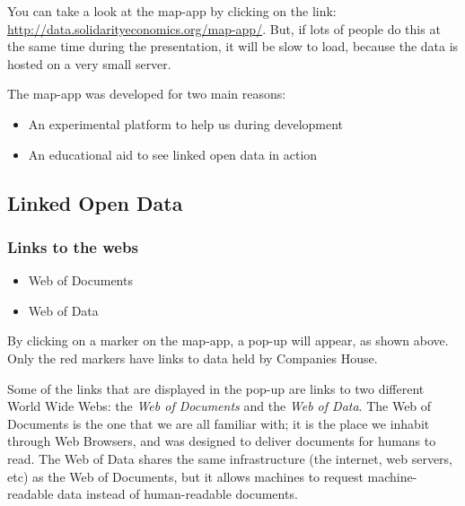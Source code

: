 You can take a look at the map-app by clicking on the link: \url{http://data.solidarityeconomics.org/map-app/}.
But, if lots of people do this at the same time during the presentation, it will be slow to load, because the data is hosted on a very small server.

The map-app was developed for two main reasons:
  \begin{itemize}
    \item An experimental platform to help us during development
    \item An educational aid to see linked open data in action 
  \end{itemize}

\subsection{Linked Open Data}
\frame
{
  \frametitle{Links to the webs}
  \begin{center}
  \end{center}
  \begin{itemize}
    \item Web of Documents
    \item Web of Data
  \end{itemize}
}
By clicking on a marker on the map-app, a pop-up will appear, as shown above.
Only the red markers have links to data held by Companies House.


Some of the links that are displayed in the pop-up are links to two different World Wide Webs: the \textit{Web of Documents} and the \textit{Web of Data}.
The Web of Documents is the one that we are all familiar with; it is the place we inhabit through Web Browsers, and was designed to deliver documents for humans to read.
The Web of Data shares the same infrastructure (the internet, web servers, etc) as the Web of Documents, but it allows machines to request machine-readable data instead of human-readable documents.

